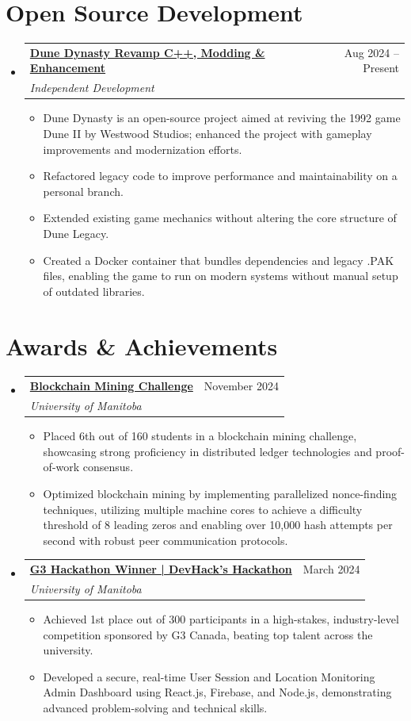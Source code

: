 \documentclass[letterpaper,11pt]{article}
\makeatletter
\newcommand{\resumeItem}[1]{
  \item\small{
    {#1 \vspace{-2pt}}
  }
}
\newcommand{\resumeSubheading}[4]{
  \vspace{-2pt}\item
    \begin{tabular*}{0.97\textwidth}[t]{l@{\extracolsep{\fill}}r}
      \textbf{#1} & #2 \\
      \textit{\small#3} & \textit{\small #4} \\
    \end{tabular*}\vspace{-4pt} %
}
\newcommand{\resumeSubHeadingListStart}{\begin{itemize}[leftmargin=0.15in, label={}]}
\newcommand{\resumeSubHeadingListEnd}{\end{itemize}}
\newcommand{\resumeItemListStart}{\begin{itemize}}
\newcommand{\resumeItemListEnd}{\end{itemize}\vspace{-6pt}} %
\makeatother
\begin{document}
\section{Open Source Development}
\resumeSubHeadingListStart
    \resumeSubheading
      {\href{https://github.com/Ali90922/Dune-Legacy-WestWood2}{Dune Dynasty Revamp \textbar{} C++, Modding \& Enhancement}}{Aug 2024 -- Present}
      {Independent Development}{}
      \resumeItemListStart
        \resumeItem{Dune Dynasty is an open-source project aimed at reviving the 1992 game Dune II by Westwood Studios; enhanced the project with gameplay improvements and modernization efforts.}
        \resumeItem{Refactored legacy code to improve performance and maintainability on a personal branch.}
        \resumeItem{Extended existing game mechanics without altering the core structure of Dune Legacy.}
        \resumeItem{Created a Docker container that bundles dependencies and legacy .PAK files, enabling the game to run on modern systems without manual setup of outdated libraries.}
      \resumeItemListEnd
\resumeSubHeadingListEnd

\vspace{-8pt} %

\section{Awards \& Achievements}
\resumeSubHeadingListStart
    \resumeSubheading
      {\href{https://github.com/Ali90922/G3-Hackathon}{Blockchain Mining Challenge}}{November 2024}
      {University of Manitoba}{}
      \resumeItemListStart
        \resumeItem{Placed 6th out of 160 students in a blockchain mining challenge, showcasing strong proficiency in distributed ledger technologies and proof-of-work consensus.}
        \resumeItem{Optimized blockchain mining by implementing parallelized nonce-finding techniques, utilizing multiple machine cores to achieve a difficulty threshold of 8 leading zeros and enabling over 10,000 hash attempts per second with robust peer communication protocols.}
      \resumeItemListEnd

      \resumeSubheading
      {\href{https://github.com/Ali90922/G3-Hackathon}{G3 Hackathon Winner | DevHack's Hackathon}}{March 2024}
      {University of Manitoba}{}
      \resumeItemListStart
        \resumeItem{Achieved 1st place out of 300 participants in a high-stakes, industry-level competition sponsored by G3 Canada, beating top talent across the university.}
        \resumeItem{Developed a secure, real-time User Session and Location Monitoring Admin Dashboard using React.js, Firebase, and Node.js, demonstrating advanced problem-solving and technical skills.}
      \resumeItemListEnd
\resumeSubHeadingListEnd
\end{document}
